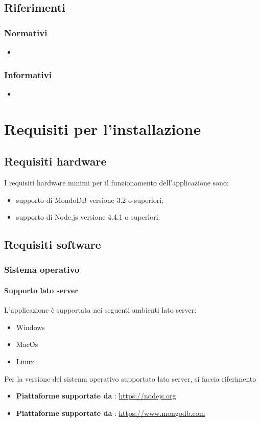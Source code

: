 \documentclass[12pt,a4paper]{article}
\begin{document}
	\subsection{Riferimenti}
	
	\subsubsection{Normativi}
	\begin{itemize}
		\item \TODO{}
		
	\end{itemize}
	
	\subsubsection{Informativi}
	\begin{itemize}
		\item \TODO{}
	\end{itemize}
	
	\newpage
	\section{Requisiti per l'installazione}\label{requisiti}
	\subsection{Requisiti hardware}\label{requisitiHW}
	I requisiti hardware minimi per il funzionamento dell'applicazione sono:
	\begin{itemize}
		\item supporto di MondoDB versione 3.2 o superiori;
		\item supporto di Node.js versione 4.4.1 o superiori.
	\end{itemize}
	\subsection{Requisiti software}\label{requisitiSW}
	\subsubsection{Sistema operativo}
	\paragraph{Supporto lato server}L'applicazione \prj{} è supportata nei seguenti ambienti lato server:
	\begin{itemize}
		\item Windows 
		\item MacOs
		\item Linux
	\end{itemize}
	Per la versione del sistema operativo supportato lato server, si faccia riferimento 
	\begin{itemize}
		\item \textbf{Piattaforme supportate da }: \url{https://nodejs.org}  
		\item \textbf{Piattaforme supportate da }: \url{https://www.mongodb.com}
	\end{itemize}
\end{document}
